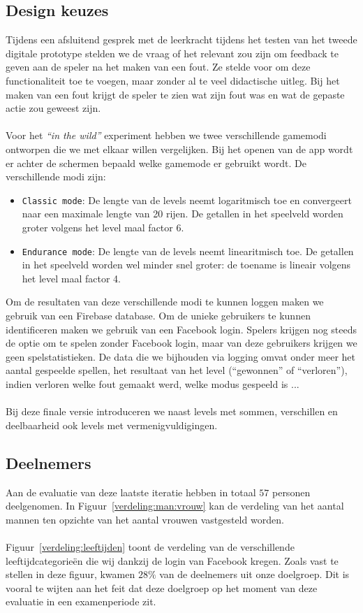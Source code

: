 \documentclass[11pt]{article}
\begin{document}
	\subsection{Design keuzes}
	Tijdens een afsluitend gesprek met de leerkracht tijdens het testen van het tweede digitale prototype stelden we de vraag of het relevant zou zijn om feedback te geven aan de speler na het maken van een fout. Ze stelde voor om deze functionaliteit toe te voegen, maar zonder al te veel didactische uitleg. Bij het maken van een fout krijgt de speler te zien wat zijn fout was en wat de gepaste actie zou geweest zijn.\\\\
    Voor het \textit{``in the wild''} experiment hebben we twee verschillende gamemodi ontworpen die we met elkaar willen vergelijken. Bij het openen van de app wordt er achter de schermen bepaald welke gamemode er gebruikt wordt. De verschillende modi zijn:
    
\begin{itemize}
\item \texttt{Classic mode}: De lengte van de levels neemt logaritmisch toe en convergeert naar een maximale lengte van 20 rijen. De getallen in het speelveld worden groter volgens het level maal factor 6.
\item \texttt{Endurance mode}: De lengte van de levels neemt linearitmisch toe. De getallen in het speelveld worden wel minder snel groter: de toename is lineair volgens het level maal factor 4.
\end{itemize}
Om de resultaten van deze verschillende modi te kunnen loggen maken we gebruik van een Firebase database. Om de unieke gebruikers te kunnen identificeren maken we gebruik van een Facebook login. Spelers krijgen nog steeds de optie om te spelen zonder Facebook login, maar van deze gebruikers krijgen we geen spelstatistieken. De data die we bijhouden via logging omvat onder meer het aantal gespeelde spellen, het resultaat van het level (``gewonnen'' of ``verloren''), indien verloren welke fout gemaakt werd, welke modus gespeeld is ...\\\\
Bij deze finale versie introduceren we naast levels met sommen, verschillen en deelbaarheid ook levels met vermenigvuldigingen.
    
    \subsection{Deelnemers}
    Aan de evaluatie van deze laatste iteratie hebben in totaal $57$ personen deelgenomen. In Figuur~\ref{verdeling:man:vrouw} kan de verdeling van het aantal mannen ten opzichte van het aantal vrouwen vastgesteld worden.\\\\
    Figuur~\ref{verdeling:leeftijden} toont de verdeling van de verschillende leeftijdcategorie\"en die wij dankzij de login van Facebook kregen. Zoals vast te stellen in deze figuur, kwamen $28\%$ van de deelnemers uit onze doelgroep. Dit is vooral te wijten aan het feit dat deze doelgroep op het moment van deze evaluatie in een examenperiode zit.
\end{document}
